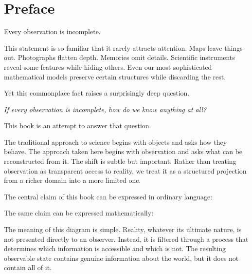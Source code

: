 
\chapter*{Preface}

Every observation is incomplete.

This statement is so familiar that it rarely attracts attention.
Maps leave things out.
Photographs flatten depth.
Memories omit details.
Scientific instruments reveal some features while hiding others.
Even our most sophisticated mathematical models preserve certain
structures while discarding the rest.

Yet this commonplace fact raises a surprisingly deep question.

\medskip
\begin{center}
\itshape
If every observation is incomplete, how do we know anything at all?
\end{center}
\medskip

This book is an attempt to answer that question.

The traditional approach to science begins with objects and asks how
they behave.
The approach taken here begins with observation and asks what can be
reconstructed from it.
The shift is subtle but important.
Rather than treating observation as transparent access to reality,
we treat it as a structured projection from a richer domain into a
more limited one.

\bigskip

The central claim of this book can be expressed in ordinary language:


The same claim can be expressed mathematically:


The meaning of this diagram is simple.
Reality, whatever its ultimate nature, is not presented directly to
an observer.
Instead, it is filtered through a process that determines which
information is accessible and which is not.
The resulting observable state contains genuine information about the
world, but it does not contain all of it.


